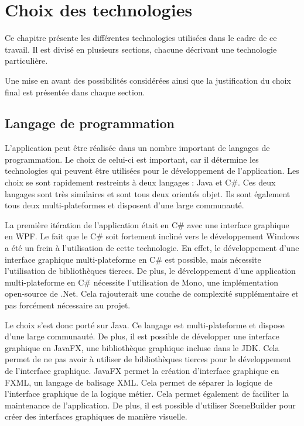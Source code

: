 \section{Choix des technologies}
Ce chapitre présente les différentes technologies utilisées dans le cadre de ce travail. Il est divisé en plusieurs sections, chacune décrivant une technologie particulière.

Une mise en avant des possibilités considérées ainsi que la justification du choix final est présentée dans chaque section.

\subsection{Langage de programmation}
L'application peut être réalisée dans un nombre important de langages de programmation. Le choix de celui-ci est important, car il détermine les technologies qui peuvent être utilisées pour le développement de l'application.
Les choix se sont rapidement restreints à deux langages : Java et C\#. Ces deux langages sont très similaires et sont tous deux orientés objet. Ils sont également tous deux multi-plateformes et disposent d'une large communauté.

La première itération de l'application était en C\# avec une interface graphique en WPF. Le fait que le C\# soit fortement incliné vers le développement Windows a été un frein à l'utilisation de cette technologie. En effet, le développement d'une interface graphique multi-plateforme en C\# est possible, mais nécessite l'utilisation de bibliothèques tierces. De plus, le développement d'une application multi-plateforme en C\# nécessite l'utilisation de Mono, une implémentation open-source de .Net. Cela rajouterait une couche de complexité supplémentaire et pas forcément nécessaire au projet.

Le choix s'est donc porté sur Java. Ce langage est multi-plateforme et dispose d'une large communauté. De plus, il est possible de développer une interface graphique en JavaFX, une bibliothèque graphique incluse dans le JDK. Cela permet de ne pas avoir à utiliser de bibliothèques tierces pour le développement de l'interface graphique. JavaFX permet la création d'interface graphique en FXML, un langage de balisage XML. Cela permet de séparer la logique de l'interface graphique de la logique métier. Cela permet également de faciliter la maintenance de l'application. De plus, il est possible d'utiliser SceneBuilder pour créer des interfaces graphiques de manière visuelle.

